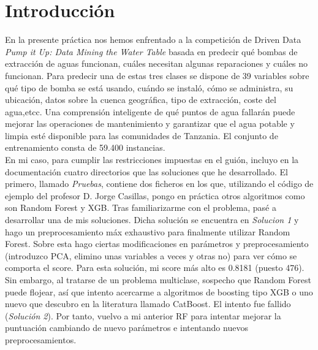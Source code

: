 \newpage
	
\tableofcontents %
	
\listoffigures

	
\newpage




\section{Introducción}

En la presente práctica nos hemos enfrentado a la competición de Driven Data \textit{Pump it Up: Data Mining the Water Table} basada en predecir qué bombas de extracción de aguas funcionan, cuáles necesitan algunas reparaciones y cuáles no funcionan. Para predecir una de estas tres clases se dispone de 39 variables sobre qué tipo de bomba se está usando, cuándo se instaló, cómo se administra, su ubicación, datos sobre la cuenca geográfica, tipo de extracción, coste del agua,etcc. Una comprensión inteligente de qué puntos de agua fallarán puede mejorar las operaciones de mantenimiento y garantizar que el agua potable y limpia esté disponible para las comunidades de Tanzania. El conjunto de entrenamiento consta de 59.400 instancias. \\

En mi caso, para cumplir las restricciones impuestas en el guión, incluyo en la documentación cuatro directorios que las soluciones que he desarrollado. El primero, llamado \textit{Pruebas}, contiene dos ficheros en los que, utilizando el código de ejemplo del profesor D. Jorge Casillas, pongo en práctica otros algoritmos como son Random Forest y XGB. Tras familiarizarme con el problema, pasé a desarrollar una de mis soluciones. Dicha solución se encuentra en \textit{Solucion 1} y hago un preprocesamiento máx exhaustivo para finalmente utilizar Random Forest. Sobre esta hago ciertas modificaciones en parámetros y preprocesamiento (introduzco PCA, elimino unas variables a veces y otras no) para ver cómo se comporta el score. Para esta solución, mi score más alto es 0.8181 (puesto 476). \\

Sin embargo, al tratarse de un problema multiclase, sospecho que Random Forest puede flojear, así que intento acercarme a algoritmos de boosting tipo XGB o uno nuevo que descubro en la literatura llamado CatBoost. El intento fue fallido (\textit{Solución 2}). Por tanto, vuelvo a mi anterior RF para intentar mejorar la puntuación cambiando de nuevo parámetros e intentando nuevos preprocesamientos. \\


